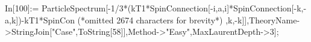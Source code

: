 In[100]:= ParticleSpectrum[-1/3*(kT1*SpinConnection[-i,a,i]*SpinConnection[-k,-a,k])-kT1*SpinCon (*omitted 2674 characters for brevity*) ,k,-k]],TheoryName->StringJoin["Case",ToString[58]],Method->"Easy",MaxLaurentDepth->3];